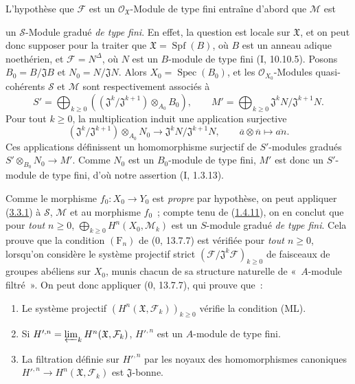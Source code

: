 L'hypothèse que $\mathcal F$ est un $\mathcal O_{\mathfrak X}$-Module de type
fini entraîne d'abord que $\mathcal M$ est

un $\mathcal S$-Module gradué \emph{de type fini}. En effet, la question est
locale sur $\mathfrak X$, et on peut donc supposer pour la traiter que
$\mathfrak X=\operatorname{Spf}(B)$, où $B$ est un anneau adique noethérien,
et $\mathcal F=N^\Delta$, où $N$ est un $B$-module de type fini
(I, 10.10.5). Posons $B_0=B/\mathfrak J B$ et $N_0=N/\mathfrak JN$.
Alors $X_0=\operatorname{Spec}(B_0)$, et les
$\mathcal O_{X_0}$-Modules quasi-cohérents $\mathcal S$ et $\mathcal M$
sont respectivement associés à
\[
S'=\bigoplus_{k\geq0}
((\mathfrak J^k/\mathfrak J^{k+1})\otimes_{A_0}B_0),\qquad
M'=\bigoplus_{k\geq0}\mathfrak J^kN/\mathfrak J^{k+1}N.
\]
Pour tout $k\geq0$, la multiplication induit une application surjective
\[
(\mathfrak J^k/\mathfrak J^{k+1})\otimes_{A_0}N_0
\longrightarrow\mathfrak J^kN/\mathfrak J^{k+1}N,
\qquad \overline a\otimes\overline n\longmapsto\overline{an}.
\]
Ces applications définissent un homomorphisme surjectif de
$S'$-modules gradués $S'\otimes_{B_0}N_0\longrightarrow M'$.
Comme $N_0$ est un $B_0$-module de type fini, $M'$ est donc un
$S'$-module de type fini, d'où notre assertion (I, 1.3.13).

Comme le morphisme $f_0:X_0\to Y_0$ est \emph{propre} par hypothèse, on peut
appliquer (\hyperref[III.3.3.1-fr]{3.3.1}) à $\mathcal S$, $\mathcal M$ et au
morphisme $f_0$~; compte tenu de (\hyperref[III.1.4.11-fr]{1.4.11}), on en
conclut que pour \emph{tout $n\geq0$},
$\bigoplus_{k\geq0}H^n(X_0,\mathcal M_k)$ est un $S$-module gradué \emph{de
type fini}. Cela prouve que la condition $(\mathrm F_n)$ de (0, 13.7.7) est
vérifiée pour \emph{tout $n\geq0$}, lorsqu'on considère le système projectif
strict $(\mathcal F/\mathfrak J^k\mathcal F)_{k\geq0}$ de faisceaux de
groupes abéliens sur $X_0$, munis chacun de sa structure naturelle de
«~$A$-module filtré~». On peut donc appliquer (0, 13.7.7), qui prouve que~:
\begin{enumerate}
\item[$1^\circ$] Le système projectif
$(H^n(\mathfrak X,\mathcal F_k))_{k\geq0}$ vérifie la condition (ML).
\item[$2^\circ$] Si
$H'^{,n}=\varprojlim_kH^n(\mathfrak X,\mathcal F_k)$, $H'^{,n}$ est un
$A$-module de type fini.
\item[$3^\circ$] La filtration définie sur $H'^{,n}$ par les noyaux des
homomorphismes canoniques $H'^{,n}\to H^n(\mathfrak X,\mathcal F_k)$ est
$\mathfrak J$-bonne.
\end{enumerate}

